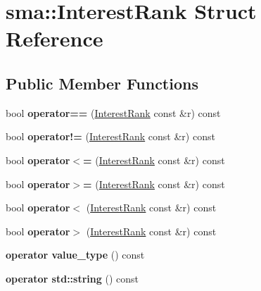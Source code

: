 \hypertarget{structsma_1_1InterestRank}{\section{sma\-:\-:Interest\-Rank Struct Reference}
\label{structsma_1_1InterestRank}
}
\subsection*{Public Member Functions}
\begin{DoxyCompactItemize}
\item 
\hypertarget{structsma_1_1InterestRank_adca7702a3a97a882a7a328b579f9b204}{bool {\bfseries operator==} (\hyperlink{structsma_1_1InterestRank}{Interest\-Rank} const \&r) const }\label{structsma_1_1InterestRank_adca7702a3a97a882a7a328b579f9b204}

\item 
\hypertarget{structsma_1_1InterestRank_a2cf773eb98077660ac05c983c20c9afd}{bool {\bfseries operator!=} (\hyperlink{structsma_1_1InterestRank}{Interest\-Rank} const \&r) const }\label{structsma_1_1InterestRank_a2cf773eb98077660ac05c983c20c9afd}

\item 
\hypertarget{structsma_1_1InterestRank_abc2f757dc8d90c342f241eac2872a872}{bool {\bfseries operator$<$=} (\hyperlink{structsma_1_1InterestRank}{Interest\-Rank} const \&r) const }\label{structsma_1_1InterestRank_abc2f757dc8d90c342f241eac2872a872}

\item 
\hypertarget{structsma_1_1InterestRank_aee2592b5b4f3a49c8da84dfd263c78e3}{bool {\bfseries operator$>$=} (\hyperlink{structsma_1_1InterestRank}{Interest\-Rank} const \&r) const }\label{structsma_1_1InterestRank_aee2592b5b4f3a49c8da84dfd263c78e3}

\item 
\hypertarget{structsma_1_1InterestRank_ad4a93100d17f214a5029d116b0cb7fb5}{bool {\bfseries operator$<$} (\hyperlink{structsma_1_1InterestRank}{Interest\-Rank} const \&r) const }\label{structsma_1_1InterestRank_ad4a93100d17f214a5029d116b0cb7fb5}

\item 
\hypertarget{structsma_1_1InterestRank_a6b64e7469866ef6a871500b0738e7cca}{bool {\bfseries operator$>$} (\hyperlink{structsma_1_1InterestRank}{Interest\-Rank} const \&r) const }\label{structsma_1_1InterestRank_a6b64e7469866ef6a871500b0738e7cca}

\item 
\hypertarget{structsma_1_1InterestRank_ad5cc9fa8e5ac5033eb4155bf52feae81}{{\bfseries operator value\-\_\-type} () const }\label{structsma_1_1InterestRank_ad5cc9fa8e5ac5033eb4155bf52feae81}

\item 
\hypertarget{structsma_1_1InterestRank_acf11198c30e84f46a1eae10b7c10b061}{{\bfseries operator std\-::string} () const }\label{structsma_1_1InterestRank_acf11198c30e84f46a1eae10b7c10b061}

\end{DoxyCompactItemize}
